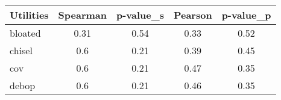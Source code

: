 \begin{tabular}{l| c c c c}
\toprule
 Utilities & Spearman & p-value_s & Pearson & p-value_p \\

\midrule
bloated & 0.31 & 0.54 & 0.33 & 0.52 \\
chisel & 0.6 & 0.21 & 0.39 & 0.45 \\
cov & 0.6 & 0.21 & 0.47 & 0.35 \\
debop & 0.6 & 0.21 & 0.46 & 0.35 \\
\bottomrule
\end{tabular}
